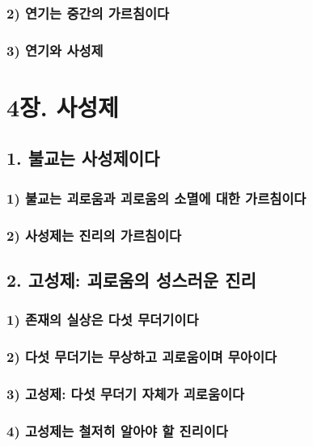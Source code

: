 \documentclass[12pt, a4paper, oneside]{book}
\begin{document}
	\section{2) 연기는 중간의 가르침이다}
	\section{3) 연기와 사성제}


	\part{4장. 사성제}

	\newpage
	\chapter{1. 불교는 사성제이다}
	\section{1) 불교는 괴로움과 괴로움의 소멸에 대한 가르침이다}
	\section{2) 사성제는 진리의 가르침이다}

	\newpage
	\chapter{2. 고성제: 괴로움의 성스러운 진리}
	\section{1) 존재의 실상은 다섯 무더기이다}
	\section{2) 다섯 무더기는 무상하고 괴로움이며 무아이다}
	\section{3) 고성제: 다섯 무더기 자체가 괴로움이다}
	\section{4) 고성제는 철저히 알아야 할 진리이다}
\end{document}
